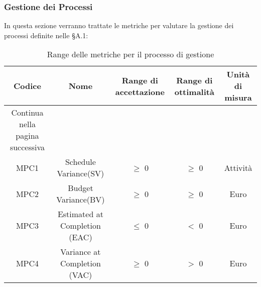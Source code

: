        \subsubsection{Gestione dei Processi}
      
        In questa sezione verranno trattate le metriche per valutare la gestione dei processi definite nelle \docNameNdP\mbox{} §A.1: 

        \begin{center}
            \renewcommand{\arraystretch}{2.2}
            
            \begin{longtable}{c c c c c }
              
              \rowcolor[HTML]{232f3e}
            
              \rowcolors{3}{tableRow}{}
             \color[HTML]{FFFFFF} \textbf{Codice} & \color[HTML]{FFFFFF} \textbf{Nome} & \color[HTML]{FFFFFF} \centering\textbf{Range di accettazione} & \color[HTML]{FFFFFF} \textbf{Range di ottimalità} & \color[HTML]{FFFFFF} \textbf{Unità di misura} \\
            \endhead
            \rowcolor{white}\multicolumn{3}{c}
               { Continua nella pagina successiva} \\
               \endfoot
               \caption [Range delle metriche per il processo di gestione]{Range delle metriche per il processo di gestione}
              \label{tabella:reqP1}
               \endlastfoot
               MPC1 & Schedule Variance(SV) & $\geq$ 0 & $\geq$ 0 & Attività \\
               MPC2 & Budget Variance(BV) & $\geq$ 0 & $\geq$ 0 & Euro \\
               MPC3 & Estimated at Completion (EAC) & $\leq$ 0 & $<$ 0 & Euro \\
               MPC4 & Variance at Completion (VAC) & $\geq$ 0 & $>$ 0 & Euro \\
            \end{longtable}

        \end{center}